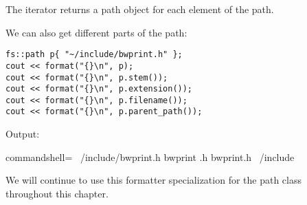 The iterator returns a path object for each element of the path.

We can also get different parts of the path:

\begin{lstlisting}[style=styleCXX]
fs::path p{ "~/include/bwprint.h" };
cout << format("{}\n", p);
cout << format("{}\n", p.stem());
cout << format("{}\n", p.extension());
cout << format("{}\n", p.filename());
cout << format("{}\n", p.parent_path());
\end{lstlisting}

Output:

\begin{tcblisting}{commandshell={}}
~/include/bwprint.h
bwprint
.h
bwprint.h
~/include
\end{tcblisting}

We will continue to use this formatter specialization for the path class throughout this chapter.



